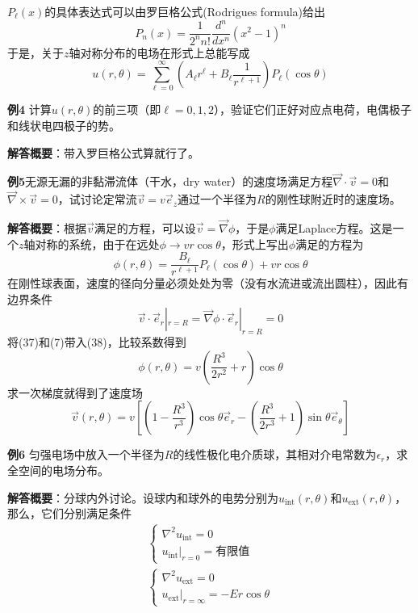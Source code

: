 \documentclass[a4paper,10pt]{ctexart}
\begin{document}
$P_\ell(x)$的具体表达式可以由罗巨格公式(Rodrigues formula)给出
\begin{equation}
P_n(x) = \frac{1}{2^n n!} \frac{d^n}{dx^n} (x^2-1)^n
\end{equation}
于是，关于$z$轴对称分布的电场在形式上总能写成
\begin{equation}
u(r,\theta) = \sum_{\ell=0}^\infty (A_\ell r^\ell + B_\ell \frac{1}{r^{\ell +1}})P_\ell(\cos \theta)
\end{equation}
\par
\textbf{例4} 计算$u(r,\theta)$的前三项（即$\ell =0,1,2$），验证它们正好对应点电荷，电偶极子和线状电四极子的势。\par
\textbf{解答概要}：带入罗巨格公式算就行了。\par
\textbf{例5}无源无漏的非黏滞流体（干水，dry water）的速度场满足方程$\vec{\nabla} \cdot \vec{v} = 0$和$\vec{\nabla} \times \vec{v} = 0$，试讨论定常流$\vec{v} = v \vec{e}_z$通过一个半径为$R$的刚性球附近时的速度场。\par
\textbf{解答概要}：根据$\vec{v}$满足的方程，可以设$\vec{v} = \vec{\nabla} \phi$，于是$\phi$满足Laplace方程。这是一个$z$轴对称的系统，由于在远处$\phi \rightarrow vr\cos \theta$，形式上写出$\phi$满足的方程为
\begin{equation}
\phi (r,\theta) = \frac{B_\ell}{r^{\ell+1}} P_\ell (\cos \theta) + vr\cos\theta
\end{equation}
在刚性球表面，速度的径向分量必须处处为零（没有水流进或流出圆柱），因此有边界条件
\begin{equation}
\vec{v} \cdot \vec{e}_r |_{r=R}= \vec{\nabla} \phi \cdot \vec{e}_r |_{r=R}= 0
\end{equation}
将(37)和(7)带入(38)，比较系数得到
\begin{equation}
\phi(r,\theta) = v(\frac{R^3}{2r^2} + r)\cos \theta
\end{equation}
求一次梯度就得到了速度场
\begin{equation}
\vec{v}(r,\theta) = v[(1-\frac{R^3}{r^3})\cos\theta \vec{e}_r - (\frac{R^3}{2r^3}+1) \sin \theta \vec{e}_\theta]
\end{equation}\par
\textbf{例6} 匀强电场中放入一个半径为$R$的线性极化电介质球，其相对介电常数为$\epsilon_r$，求全空间的电场分布。\par
\textbf{解答概要}：分球内外讨论。设球内和球外的电势分别为$u_{\mathrm{int}}(r,\theta)$和$u_{\mathrm{ext}}(r,\theta)$，那么，它们分别满足条件
\begin{gather}
\begin{cases}
\nabla^2 u_\mathrm{int} = 0 \\
u_\mathrm{int}|_{r=0} = \text{有限值}
\end{cases} \\
\begin{cases}
\nabla^2 u_\mathrm{ext} = 0 \\
u_\mathrm{ext}|_{r=\infty} = -Er\cos\theta
\end{cases}
\end{gather}
\end{document}
